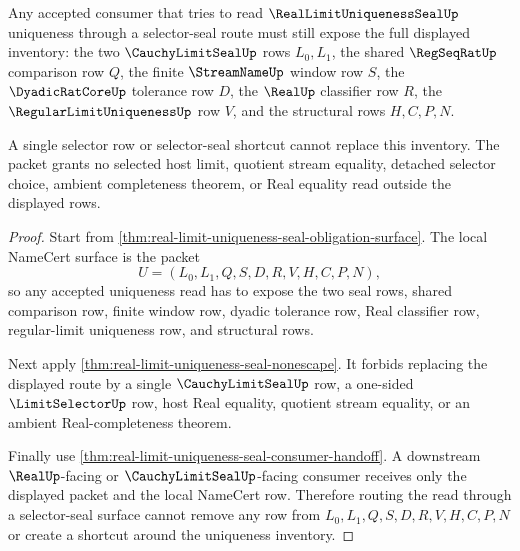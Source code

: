 \begin{theorem}
\label{thm:real-limit-uniqueness-selector-seal-nonescape}
Any accepted consumer that tries to read $\RealLimitUniquenessSealUp$ uniqueness
through a selector-seal route must still expose the full displayed inventory:
the two $\CauchyLimitSealUp$ rows $L_0,L_1$, the shared $\RegSeqRatUp$
comparison row $Q$, the finite $\StreamNameUp$ window row $S$, the
$\DyadicRatCoreUp$ tolerance row $D$, the $\RealUp$ classifier row $R$, the
$\RegularLimitUniquenessUp$ row $V$, and the structural rows $H,C,P,N$.

A single selector row or selector-seal shortcut cannot replace this inventory.
The packet grants no selected host limit, quotient stream equality, detached
selector choice, ambient completeness theorem, or Real equality read outside
the displayed rows.
\end{theorem}
\begin{proof}
Start from \autoref{thm:real-limit-uniqueness-seal-obligation-surface}. The
local NameCert surface is the packet
$$
U=(L_0,L_1,Q,S,D,R,V,H,C,P,N),
$$
so any accepted uniqueness read has to expose the two seal rows, shared
comparison row, finite window row, dyadic tolerance row, Real classifier row,
regular-limit uniqueness row, and structural rows.

Next apply \autoref{thm:real-limit-uniqueness-seal-nonescape}. It forbids
replacing the displayed route by a single $\CauchyLimitSealUp$ row, a one-sided
$\LimitSelectorUp$ row, host Real equality, quotient stream equality, or an
ambient Real-completeness theorem.

Finally use \autoref{thm:real-limit-uniqueness-seal-consumer-handoff}. A
downstream $\RealUp$-facing or $\CauchyLimitSealUp$-facing consumer receives
only the displayed packet and the local NameCert row. Therefore routing the
read through a selector-seal surface cannot remove any row from
$L_0,L_1,Q,S,D,R,V,H,C,P,N$ or create a shortcut around the uniqueness
inventory.
\end{proof}

